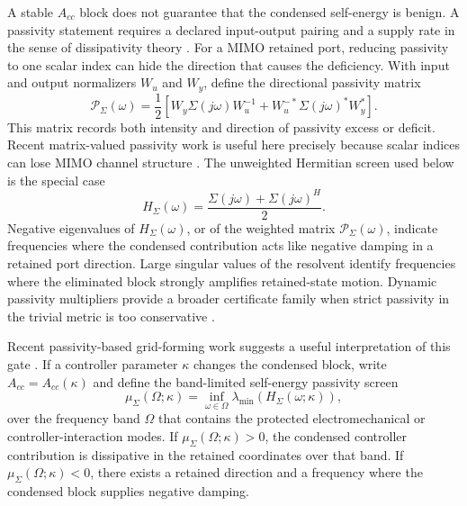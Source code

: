A stable \(A_{cc}\) block does not guarantee that the condensed self-energy is
benign. A passivity statement requires a declared input-output pairing and a
supply rate in the sense of dissipativity theory \cite{willems1972dissipative}.
For a MIMO retained port, reducing passivity to one scalar index can hide the
direction that causes the deficiency. With input and output normalizers
\(W_u\) and \(W_y\), define the directional passivity matrix
\begin{equation}
  \mathcal P_\Sigma(\omega)
  =
  \frac12
  \left[
  W_y\Sigma(j\omega)W_u^{-1}
  +
  W_u^{-*}\Sigma(j\omega)^*W_y^*
  \right].
  \label{eq:self_directional_passivity}
\end{equation}
This matrix records both intensity and direction of passivity excess or
deficit. Recent matrix-valued passivity work is useful here precisely because
scalar indices can lose MIMO channel structure \cite{ru2026matrix}. The
unweighted Hermitian screen used below is the special case
\begin{equation}
  H_\Sigma(\omega)=
  \frac{\Sigma(j\omega)+\Sigma(j\omega)^H}{2}.
  \label{eq:self_hermitian}
\end{equation}
Negative eigenvalues of \(H_\Sigma(\omega)\), or of the weighted matrix
\(\mathcal P_\Sigma(\omega)\), indicate frequencies where the condensed
contribution acts like negative damping in a retained port direction. Large
singular values of the resolvent identify frequencies where the eliminated
block strongly amplifies retained-state motion. Dynamic passivity multipliers
provide a broader certificate family when strict passivity in the trivial
metric is too conservative \cite{gorbunov2026dynamic}.

Recent passivity-based grid-forming work suggests a useful interpretation of
this gate \cite{he2024passivity,gui2024passivity}. If a controller parameter
\(\kappa\) changes the condensed block, write
\(A_{cc}=A_{cc}(\kappa)\) and define the band-limited self-energy passivity
screen
\begin{equation}
  \mu_\Sigma(\Omega;\kappa)
  =
  \inf_{\omega\in\Omega}
  \lambda_{\min}\!\left(H_\Sigma(\omega;\kappa)\right),
  \label{eq:self_passivity_index}
\end{equation}
over the frequency band \(\Omega\) that contains the protected electromechanical
or controller-interaction modes. If \(\mu_\Sigma(\Omega;\kappa)>0\), the condensed
controller contribution is dissipative in the retained coordinates over that
band. If \(\mu_\Sigma(\Omega;\kappa)<0\), there exists a retained direction and a
frequency where the condensed block supplies negative damping.

